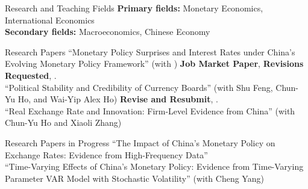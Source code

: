 \documentclass{resume_liang} %
\begin{document}
\begin{rSection}{Research and Teaching Fields}
{\bf Primary fields:} Monetary Economics, International Economics 
\vspace{0.1cm} \\ 
{\bf Secondary fields:} Macroeconomics, Chinese Economy 
\end{rSection}
\bigskip  




\begin{rSection}{Research Papers}
``Monetary Policy Surprises and Interest Rates under China's Evolving Monetary Policy Framework'' (with \href{https://sites.google.com/site/chunyuho}{\color{black}{Chun-Yu Ho}}) \textbf{Job Market Paper}, \textbf{Revisions Requested}, \textit{}.
\vspace{0.1cm} \\
``Political Stability and Credibility of Currency Boards'' (with Shu Feng, Chun-Yu Ho, and Wai-Yip Alex Ho) \textbf{Revise and Resubmit}, \textit{}.
\vspace{0.1cm} \\
``Real Exchange Rate and Innovation: Firm-Level Evidence from China'' (with Chun-Yu Ho and Xiaoli Zhang) 
\end{rSection}
\bigskip  




\begin{rSection}{Research Papers in Progress}
``The Impact of China's Monetary Policy on Exchange Rates: Evidence from High-Frequency Data''
\vspace{0.1cm}\\
``Time-Varying Effects of China's Monetary Policy: Evidence from Time-Varying Parameter VAR Model with Stochastic Volatility'' (with Cheng Yang)
\end{rSection}
\bigskip  
\end{document}

